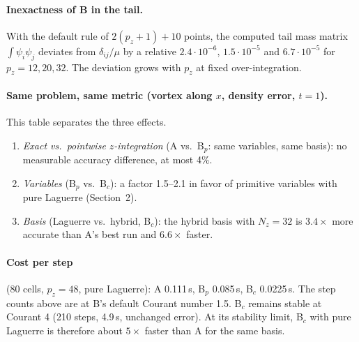 \documentclass[11pt,a4paper]{article}
\begin{document}
\paragraph{Inexactness of B in the tail.}
With the default rule of $2(p_z+1)+10$ points, the computed tail mass matrix
$\int\psi_i\psi_j$ deviates from $\delta_{ij}/\mu$ by a relative
$2.4\cdot10^{-6}$, $1.5\cdot10^{-5}$ and $6.7\cdot10^{-5}$ for $p_z=12,20,32$. The
deviation grows with $p_z$ at fixed over-integration.

\paragraph{Same problem, same metric (vortex along $x$, density error, $t=1$).}
\begin{center}
\end{center}
This table separates the three effects.
\begin{enumerate}
\item \emph{Exact vs.\ pointwise $z$-integration} (A vs.\ B$_p$: same variables,
  same basis): no measurable accuracy difference, at most 4\%.
\item \emph{Variables} (B$_p$ vs.\ B$_c$): a factor 1.5--2.1 in favor of primitive
  variables with pure Laguerre (Section~2).
\item \emph{Basis} (Laguerre vs.\ hybrid, B$_c$): the hybrid basis with $N_z=32$ is
  $3.4\times$ more accurate than A's best run and $6.6\times$ faster.
\end{enumerate}

\paragraph{Cost per step} (80 cells, $p_z=48$, pure Laguerre): A 0.111\,s,
B$_p$ 0.085\,s, B$_c$ 0.0225\,s. The step counts above are at B's default Courant
number 1.5. B$_c$ remains stable at Courant 4 (210 steps, 4.9\,s, unchanged error).
At its stability limit, B$_c$ with pure Laguerre is therefore about $5\times$
faster than A for the same basis.
\end{document}
